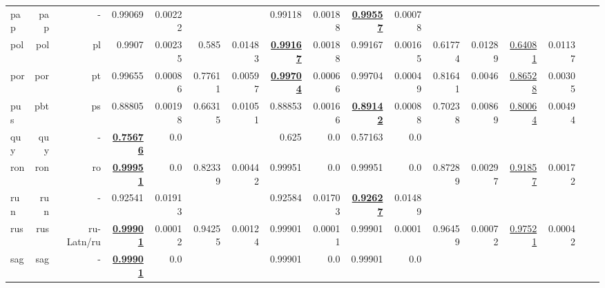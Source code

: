 \documentclass[11pt]{article}
\begin{document}
\begin{table*}[h]
{\begin{tabular}{lrrrrrrrrrrrrrrrr}
pap         & pap         & -         & 0.99069         & 0.00222         &          &          & 0.99118         & 0.00188         & \textbf{\underline{0.99557}}         & 0.00078         &          &          &          &          \\
pol         & pol         & pl         & 0.9907         & 0.00235         & 0.585         & 0.01483         & \textbf{\underline{0.99167}}         & 0.00188         & 0.99167         & 0.00165         & 0.61774         & 0.01289         & \underline{0.64081}         & 0.01137         \\
por         & por         & pt         & 0.99655         & 0.00086         & 0.77611         & 0.00597         & \textbf{\underline{0.99704}}         & 0.00066         & 0.99704         & 0.00049         & 0.81641         & 0.0046         & \underline{0.86528}         & 0.00305         \\
pus         & pbt         & ps         & 0.88805         & 0.00198         & 0.66315         & 0.01051         & 0.88853         & 0.00166         & \textbf{\underline{0.89142}}         & 0.00088         & 0.70238         & 0.00869         & \underline{0.80064}         & 0.00494         \\
quy         & quy         & -         & \textbf{\underline{0.75676}}         & 0.0         &          &          & 0.625         & 0.0         & 0.57163         & 0.0         &          &          &          &          \\
ron         & ron         & ro         & \textbf{\underline{0.99951}}         & 0.0         & 0.82339         & 0.00442         & 0.99951         & 0.0         & 0.99951         & 0.0         & 0.87289         & 0.00297         & \underline{0.91857}         & 0.00172         \\
run         & run         & -         & 0.92541         & 0.01913         &          &          & 0.92584         & 0.01703         & \textbf{\underline{0.92627}}         & 0.01489         &          &          &          &          \\
rus         & rus         & ru-Latn/ru         & \textbf{\underline{0.99901}}         & 0.00012         & 0.94255         & 0.00124         & 0.99901         & 0.00011         & 0.99901         & 0.0001         & 0.96459         & 0.00072         & \underline{0.97521}         & 0.00042         \\
sag         & sag         & -         & \textbf{\underline{0.99901}}         & 0.0         &          &          & 0.99901         & 0.0         & 0.99901         & 0.0         &          &          &          &          \\

\end{tabular}}
\end{table*}
\end{document}
